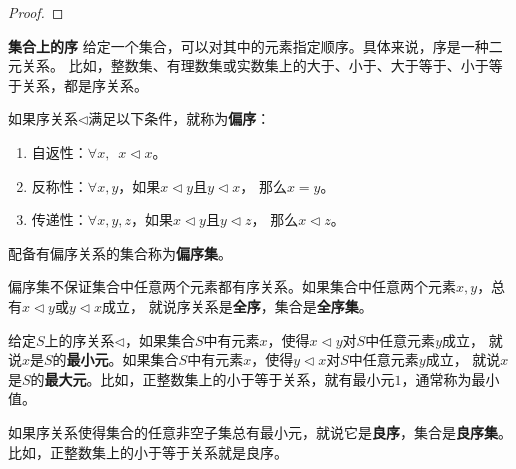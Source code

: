 \documentclass[12pt,UTF8,fontset=none]{ctexbook}
\begin{document}
\begin{appendix}
\begin{proof}
\end{proof}

\begin{df}{\textbf{集合上的序}}
    给定一个集合，可以对其中的元素指定顺序。具体来说，序是一种二元关系。
    比如，整数集、有理数集或实数集上的大于、小于、大于等于、小于等于关系，都是序关系。

    如果序关系$\triangleleft$满足以下条件，就称为\textbf{偏序}：
    \begin{enumerate}
        \item 自返性：$\forall x, \,\,\, x \triangleleft x$。
        \item 反称性：$\forall x, y$，如果$x \triangleleft y$且$y \triangleleft x$， 那么$x = y$。
        \item 传递性：$\forall x, y, z$，如果$x \triangleleft y$且$y \triangleleft z$， 那么$x \triangleleft z$。
    \end{enumerate}
    配备有偏序关系的集合称为\textbf{偏序集}。

    偏序集不保证集合中任意两个元素都有序关系。如果集合中任意两个元素$x, y$，总有$x \triangleleft y$或$y \triangleleft x$成立，
    就说序关系是\textbf{全序}，集合是\textbf{全序集}。

    给定$S$上的序关系$\triangleleft$，如果集合$S$中有元素$x$，使得$x \triangleleft y$对$S$中任意元素$y$成立，
    就说$x$是$S$的\textbf{最小元}。如果集合$S$中有元素$x$，使得$y \triangleleft x$对$S$中任意元素$y$成立，
    就说$x$是$S$的\textbf{最大元}。比如，正整数集上的小于等于关系，就有最小元$1$，通常称为最小值。
    
    如果序关系使得集合的任意非空子集总有最小元，就说它是\textbf{良序}，集合是\textbf{良序集}。
    比如，正整数集上的小于等于关系就是良序。


\end{df}



\end{appendix}
\end{document}
